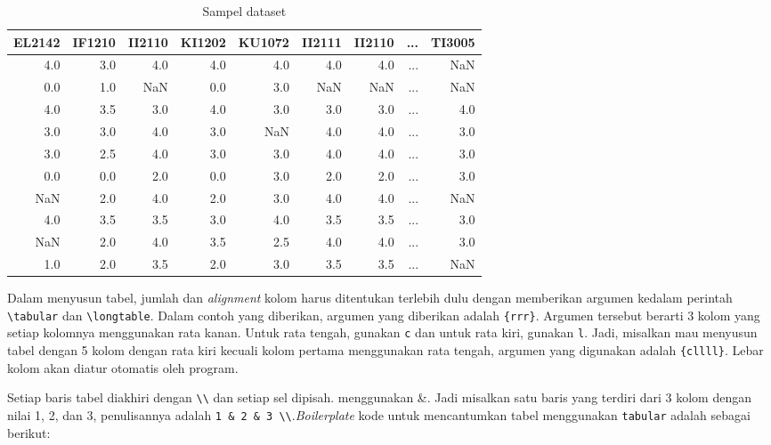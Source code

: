 \begin{table}[H]
    \centering
    \caption{Sampel dataset}
    \label{tabel:sampel_dataset}
    \begin{tabular}{rrrrrrrrr}
     \toprule
     EL2142 & IF1210 & II2110 & KI1202 & KU1072 & II2111 & II2110 & ... & TI3005\\
     \midrule
     4.0 & 3.0 & 4.0 & 4.0 & 4.0 & 4.0 & 4.0 & ... & NaN \\
     0.0 & 1.0 & NaN & 0.0 & 3.0 & NaN & NaN & ... & NaN \\
     4.0 & 3.5 & 3.0 & 4.0 & 3.0 & 3.0 & 3.0 & ... & 4.0 \\
     3.0 & 3.0 & 4.0 & 3.0 & NaN & 4.0 & 4.0 & ... & 3.0 \\
     3.0 & 2.5 & 4.0 & 3.0 & 3.0 & 4.0 & 4.0 & ... & 3.0 \\
     0.0 & 0.0 & 2.0 & 0.0 & 3.0 & 2.0 & 2.0 & ... & 3.0 \\
     NaN & 2.0 & 4.0 & 2.0 & 3.0 & 4.0 & 4.0 & ... & NaN \\
     4.0 & 3.5 & 3.5 & 3.0 & 4.0 & 3.5 & 3.5 & ... & 3.0 \\
     NaN & 2.0 & 4.0 & 3.5 & 2.5 & 4.0 & 4.0 & ... & 3.0 \\
     1.0 & 2.0 & 3.5 & 2.0 & 3.0 & 3.5 & 3.5 & ... & NaN \\
     \bottomrule
    \end{tabular}
\end{table}

Dalam menyusun tabel, jumlah dan \textit{alignment} kolom harus ditentukan terlebih dulu dengan memberikan argumen kedalam perintah \verb|\tabular| dan \verb|\longtable|. Dalam contoh yang diberikan, argumen yang diberikan adalah \verb|{rrr}|. Argumen tersebut berarti 3 kolom yang setiap kolomnya menggunakan rata kanan. Untuk rata tengah, gunakan \texttt{c} dan untuk rata kiri, gunakan \texttt{l}. Jadi, misalkan mau menyusun tabel dengan 5 kolom dengan rata kiri kecuali kolom pertama menggunakan rata tengah, argumen yang digunakan adalah \verb|{cllll}|. Lebar kolom akan diatur otomatis oleh program. 

Setiap baris tabel diakhiri dengan \verb|\\| dan setiap sel dipisah. menggunakan \&. Jadi misalkan satu baris yang terdiri dari 3 kolom dengan nilai 1, 2, dan 3, penulisannya adalah \verb|1 & 2 & 3 \\|.\textit{Boilerplate} kode untuk mencantumkan tabel menggunakan \texttt{tabular} adalah sebagai berikut:

